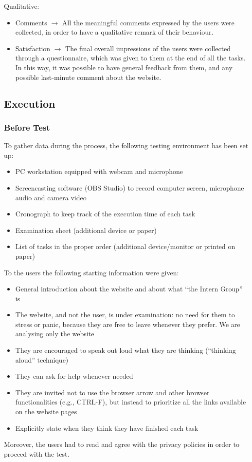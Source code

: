 \documentclass[11pt, letterpaper]{article}
\begin{document}
Qualitative: 
\begin{itemize}
    \item Comments $\rightarrow$ All the meaningful comments expressed by the users were collected, in order to have a qualitative remark of their behaviour. 
    \item Satisfaction $\rightarrow$ The final overall impressions of the users were collected through a questionnaire, which was given to them at the end of all the tasks. In this way, it was possible to have general feedback from them, and any possible last-minute comment about the website. 
\end{itemize}


\subsection{Execution}
\subsubsection{Before Test}
To gather data during the process, the following testing environment has been set up: 
\begin{itemize}
    \item PC workstation equipped with webcam and microphone 
    \item Screencasting software (OBS Studio) to record computer screen, microphone audio and camera video 
    \item Cronograph to keep track of the execution time of each task 
    \item Examination sheet (additional device or paper)
    \item List of tasks in the proper order (additional device/monitor or printed on paper)
\end{itemize}
To the users the following starting information were given: 
\begin{itemize}
    \item General introduction about the website and about what “the Intern Group” is
    \item The website, and not the user, is under examination: no need for them to stress or panic, because they are free to leave whenever they prefer. We are analysing only the website
    \item They are encouraged to speak out loud what they are thinking (“thinking aloud” technique)
    \item They can ask for help whenever needed 
    \item They are invited not to use the browser arrow and other browser functionalities (e.g., CTRL-F), but instead to prioritize all the links available on the website pages
    \item Explicitly state when they think they have finished each task
\end{itemize}
Moreover, the users had to read and agree with the privacy policies in order to proceed with the test. 
\end{document}
